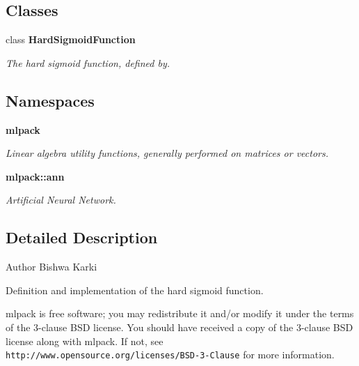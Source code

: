 \subsection*{Classes}
\begin{DoxyCompactItemize}
\item 
class \textbf{ Hard\+Sigmoid\+Function}
\begin{DoxyCompactList}\small\item\em The hard sigmoid function, defined by. \end{DoxyCompactList}\end{DoxyCompactItemize}
\subsection*{Namespaces}
\begin{DoxyCompactItemize}
\item 
 \textbf{ mlpack}
\begin{DoxyCompactList}\small\item\em Linear algebra utility functions, generally performed on matrices or vectors. \end{DoxyCompactList}\item 
 \textbf{ mlpack\+::ann}
\begin{DoxyCompactList}\small\item\em Artificial Neural Network. \end{DoxyCompactList}\end{DoxyCompactItemize}


\subsection{Detailed Description}
\begin{DoxyAuthor}{Author}
Bishwa Karki
\end{DoxyAuthor}
Definition and implementation of the hard sigmoid function.

mlpack is free software; you may redistribute it and/or modify it under the terms of the 3-\/clause B\+SD license. You should have received a copy of the 3-\/clause B\+SD license along with mlpack. If not, see {\tt http\+://www.\+opensource.\+org/licenses/\+B\+S\+D-\/3-\/\+Clause} for more information. 